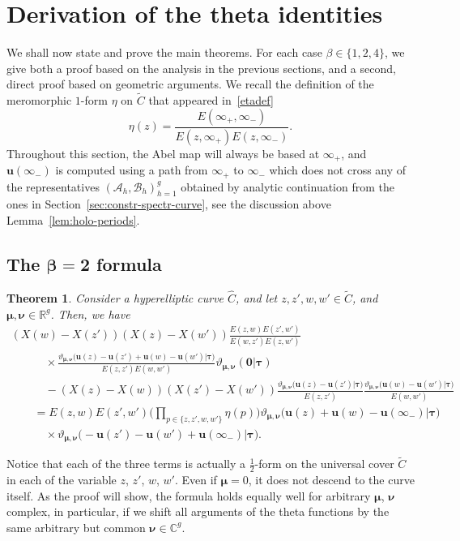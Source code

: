 \documentclass[10pt,a4paper]{amsart}
\numberwithin{equation}{section}
\newtheorem{Theorem}{Theorem}[section]
\begin{document}
\section{Derivation of the theta identities}
\label{sec:derivation-formulae}

We shall now state and prove the main theorems. For each case
$\beta \in \{1,2,4\}$, we give both a proof based on the
analysis in the previous sections, and a second, direct proof based on geometric arguments. We recall the definition of the meromorphic $1$-form $\eta$ on $\widetilde{C}$ that appeared in~\eqref{etadef}
\[
\eta(z) = \frac{E(\infty_+,\infty_-)}{E(z,\infty_+)E(z,\infty_-)}.
\]
Throughout this section, the Abel map will always be based at $\infty_+$, and $\bm{u}(\infty_-)$ is computed using a path from $\infty_+$ to $\infty_-$ which does not cross any of the representatives $(\mathcal{A}_h,\mathcal{B}_h)_{h = 1}^{g}$ obtained by analytic continuation from the ones in Section~\ref{sec:constr-spectr-curve}, see the discussion above Lemma~\ref{lem:holo-periods}.

\subsection[The beta = 2 formula]{The $\boldsymbol{\beta = 2}$ formula}

\begin{Theorem}\label{thm:formula_beta_2}
 Consider a hyperelliptic curve $\widehat{C}$, and let
 $z,z',w,w' \in \widetilde{C}$, and
 $\bm{\mu}, \bm{\nu} \in \mathbb{R}^g$. Then, we have
 \begin{gather}
  (X(w) - X(z'))(X(z) - X(w'))\frac{E(z,w)E(z',w')}{E(w,z')E(z,w')}\nonumber\\
  \qquad \quad{}\times\frac{\vartheta_{\bm{\mu},\bm{\nu}}\bigl(\bm{u}(z) - \bm{u}(z') + \bm{u}(w) - \bm{u}(w')\big|\bm{\tau}\bigr)}{E(z,z')E(w,w')}\vartheta_{\bm{\mu}, \bm{\nu}}(\bm{0}\big|\bm{\tau}) \nonumber\\
  \qquad\quad {}-(X(z) - X(w))(X(z') - X(w'))\frac{\vartheta_{\bm{\mu},\bm{\nu}}(\bm{u}(z) - \bm{u}(z')\big|\bm{\tau}\bigr)}{E(z,z')}\frac{\vartheta_{\bm{\mu},\bm{\nu}}\bigl(\bm{u}(w) - \bm{u}(w')\big|\bm{\tau}\bigr)}{E(w,w')}\nonumber\\
  \qquad {}= E(z,w)E(z',w') \biggr( \prod_{p \in \{z, z', w, w'\}} \eta(p)\biggr)\vartheta_{\bm{\mu},\bm{\nu}}\bigl(\bm{u}(z) + \bm{u}(w) -\bm{u}(\infty_-)\big|\bm{\tau}\bigr)\nonumber\\
  \qquad \quad{}\times\vartheta_{\bm{\mu},\bm{\nu}}\bigl(- \bm{u}(z') - \bm{u}(w') + \bm{u}(\infty_-)\big|\bm{\tau}\bigr).\label{eq:formula-beta-2}
 \end{gather}
\end{Theorem}
Notice that each of the three terms is actually a $\frac{1}{2}$-form on the universal cover $\widetilde{C}$ in each of the variable $z$, $z'$, $w$, $w'$. Even if $\bm{\mu} = 0$, it does not descend to the curve itself. As the proof will show, the formula holds equally well for arbitrary $\bm{\mu}$, $\bm{\nu}$ complex, in particular, if we shift all arguments of the theta functions by the same arbitrary but common $\bm{\nu} \in \mathbb{C}^g$.
\end{document}

